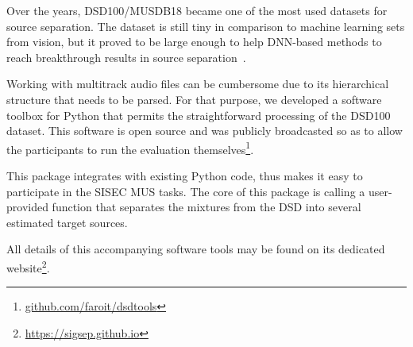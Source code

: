 Over the years, DSD100/MUSDB18 became one of the most used datasets for source separation. 
The dataset is still tiny in comparison to machine learning sets from vision, but it proved to be large enough to help DNN-based methods to reach breakthrough results in source separation~\cite{stoeter18sisec}.
\par
Working with multitrack audio files can be cumbersome due to its hierarchical structure that needs to be parsed.
For that purpose, we developed a software toolbox for Python that permits the straightforward processing of the DSD100 dataset. This software is open source and was publicly broadcasted so as to allow the participants to run the evaluation themselves\footnote{\url{github.com/faroit/dsdtools}}.
\par
This package integrates with existing Python code, thus makes it easy to participate in the SISEC MUS tasks. The core of this package is calling a user-provided function that separates the mixtures from the DSD into several estimated target sources.




All details of this accompanying software tools may be found on its dedicated website\footnote{\url{https://sigsep.github.io}}.
